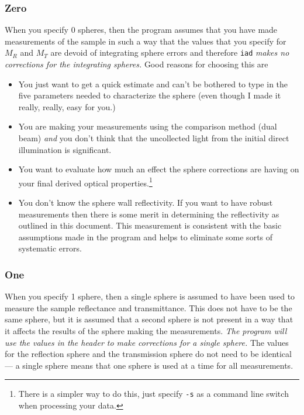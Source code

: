 \documentclass{article}
\newcommand\iadprog{\texttt{iad}}
\begin{document}
\subsubsection{Zero}

When you specify 0 spheres, then the program assumes that 
you have made measurements of the sample in such a way that the values that you
specify for $M_R$ and $M_T$ are devoid of integrating sphere errors and therefore
\iadprog{} \textit{ makes no corrections for the integrating spheres.}  Good
reasons for choosing this are
\begin{itemize}
\item
You just want to get a quick estimate and can't be bothered to type in the
five parameters needed to characterize the sphere (even though I made it really,
really, easy for you.)
\item
You are making your measurements using the comparison method (dual beam) \textit{and}
you don't think that the uncollected light from the initial direct illumination
is significant.
\item
You want to evaluate how much an effect the sphere corrections are having on
your final derived optical properties.\footnote{There is a simpler
way to do this, just specify \texttt{-s} as a command line switch when processing
your data.}
\item
You don't know the sphere wall reflectivity.  If you want to have robust measurements
then there is some merit in determining the reflectivity as outlined in this document.
This measurement is consistent with the basic assumptions made in the program and
helps to eliminate some sorts of systematic errors.
\end{itemize}


\subsubsection{One}

When you specify 1 sphere, then a single sphere is assumed to have been used to 
measure the sample reflectance and transmittance.  This does not have to be the
same sphere, but it is assumed that a second sphere is not present in a way that
it affects the results of the sphere making the measurements.
\textit{The program will use the values in the header to make corrections
for a single sphere.}  The values for the reflection sphere and the transmission
sphere do not need to be identical --- a single sphere means that one sphere is
used at a time for all measurements. 
\end{document}
